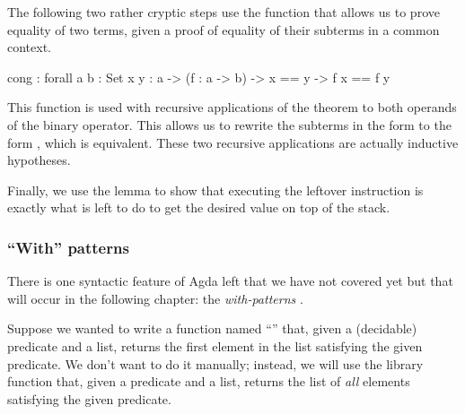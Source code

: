 The following two rather cryptic steps use the function  that allows
us to prove equality of two terms, given a proof of equality of their subterms
in a common context.

\begin{code}
  cong : forall {a b : Set} {x y : a}
    -> (f : a -> b)
    -> x == y -> f x == f y
\end{code}

\noindent This function is used with recursive applications of the theorem
 to both operands of the binary operator. This allows us
to rewrite the subterms in the form 
to the form , which is equivalent. These
two recursive applications are actually inductive hypotheses.


Finally, we use the lemma  to show that executing the
leftover instruction is exactly what is left to do to get the desired value
on top of the stack.

\subsubsection{``With'' patterns}

There is one syntactic feature of Agda left that we have not covered yet but that will
occur in the following chapter: the \emph{with-patterns} \cite[Section~2.6]{norell08}.

Suppose we wanted to write a function named ``'' that,
given a (decidable) predicate and a list, returns
the first element in the list satisfying the given predicate. We don't want to
do it manually; instead, we will use the library function  that,
given a predicate and
a list, returns the list of \emph{all} elements satisfying the given predicate.

